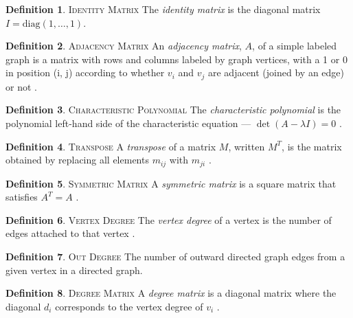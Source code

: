 \documentclass[11pt]{article}
\theoremstyle{definition}
\newtheorem{definition}{Definition}[section]
\begin{document}
	\theoremstyle{definition}
	\begin{definition}{\textsc{Identity Matrix}}
		The \emph{identity matrix} is the diagonal matrix $I = \text{diag}(1, \dots, 1)$.
	\end{definition}
	
	\theoremstyle{definition}
	\begin{definition}{\textsc{Adjacency Matrix}}
		An \emph{adjacency matrix}, $A$, of a simple labeled graph is a matrix with rows and columns labeled by graph vertices, with a 1 or 0 in position (i, j) according to whether $v_i$ and $v_j$ are adjacent (joined by an edge) or not \cite{mathworld:AdjacencyMatrix}. 
	\end{definition}
	
	\theoremstyle{definition}
	\begin{definition}{\textsc{Characteristic Polynomial}}
		The \emph{characteristic polynomial} is the polynomial left-hand side of the characteristic equation --- $\det(A - \lambda I) = 0$ \cite{mathworld:CharacteristicPoly}.
	\end{definition}
	
	\theoremstyle{definition}
	\begin{definition}{\textsc{Transpose}}
		A \emph{transpose} of a matrix $M$, written $M^T$, is the matrix obtained by replacing all elements $m_{ij}$ with $m_{ji}$ \cite{mathworld:Transpose}.
	\end{definition}
	
	\theoremstyle{definition}
	\begin{definition}{\textsc{Symmetric Matrix}}
		A \emph{symmetric matrix} is a square matrix that satisfies $A^T = A$ \cite{mathworld:SymmetricMatrix}.
	\end{definition}
	
	\theoremstyle{definition}
	\begin{definition}{\textsc{Vertex Degree}}
		The \emph{vertex degree} of a vertex is the number of edges attached to that vertex \cite{mathworld:VertexDegree}.
	\end{definition}
	
	\theoremstyle{definition}
	\begin{definition}{\textsc{Out Degree}}
		The number of outward directed graph edges from a given vertex in a directed graph.
	\end{definition}
	
	\theoremstyle{definition}
	\begin{definition}{\textsc{Degree Matrix}}
		A \emph{degree matrix} is a diagonal matrix where the diagonal $d_i$ corresponds to the vertex degree of $v_i$ \cite{mathworld:DegreeMatrix}. 
	\end{definition}
	
\end{document}
